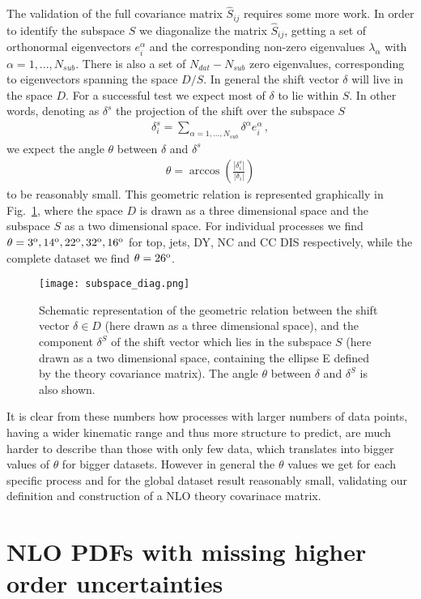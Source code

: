     The validation of the full covariance matrix $\hat{S}_{ij}$ requires some more work.
    In order to identify the subspace $S$ we diagonalize the matrix $\hat{S}_{ij}$, getting a set
    of orthonormal eigenvectors $e_i^{\alpha}$ and the corresponding non-zero eigenvalues 
    $\lambda_{\alpha}$ with $\alpha = 1, ..., N_{sub}$.
    There is also a set of $N_{dat}-N_{sub}$ zero eigenvalues, corresponding to eigenvectors spanning
    the space $D/S$.
    In general the shift vector $\delta$ will live in the space $D$. 
    For a successful test we expect most of $\delta$ to lie within $S$.
    In other words, denoting as $\delta^s$ the projection of the shift over the subspace $S$
    \begin{align}
        \delta_i^s = \sum_{\alpha=1,...,N_{sub}} \delta^{\alpha}e^{\alpha}_i\,,
    \end{align} 
    we expect the angle $\theta$ between $\delta$ and $\delta^s$
    \begin{align}
        \theta = \arccos\left(\frac{|\delta_i^s|}{|\delta_i|}\right)
    \end{align}
    to be reasonably small. This geometric relation is represented graphically in Fig.~\ref{fig:subspace_diagram},
    where the space $D$ is drawn as a three dimensional space and the subspace $S$ as a two dimensional space.
    For individual processes we find $\theta = 3^{\rm o}, 14^{\rm o}, 22^{\rm o}, 32^{\rm o}, 16^{\rm o}$ for top, jets, DY, NC and CC DIS respectively, 
    while the complete dataset we find $\theta = 26^{\rm o}$.
    \begin{figure}[t]
        \begin{center}
          \texttt{[image: subspace\_diag.png]}
          \caption{\small Schematic representation of the geometric relation
            between the shift vector $\delta\in D$ (here drawn as a three dimensional space), and
            the component $\delta^S$ of the shift vector which lies in the 
      subspace $S$ (here drawn as a two dimensional space, containing the ellipse E defined by the theory covariance matrix). 
      The angle $\theta$ between $\delta$ and $\delta^S$ is also shown.
          \label{fig:subspace_diagram} }
        \end{center}
      \end{figure}
    It is clear from these numbers how processes with larger numbers of data points, having 
    a wider kinematic range and thus more structure to predict, are much harder to describe than those 
    with only few data, which translates into bigger values of $\theta$ for bigger datasets. However in general the
    $\theta$ values we get for each specific process and for the global dataset result reasonably small, validating our definition
    and construction of a NLO theory covarinace matrix.

    \section{NLO PDFs with missing higher order uncertainties}

    